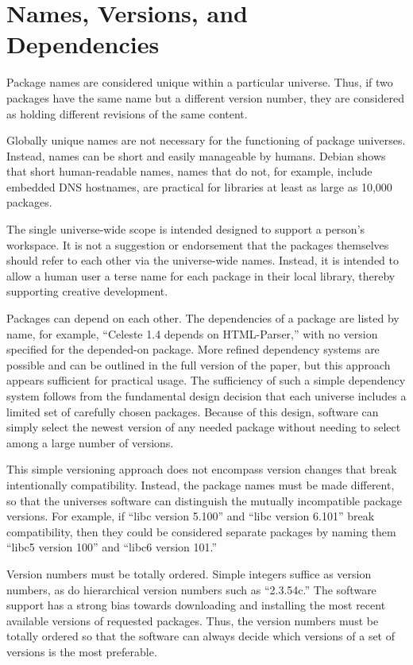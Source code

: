 \documentclass{IEEEtran}
\begin{document}
\section{Names, Versions, and Dependencies}

Package names are considered unique within a particular universe.
Thus, if two packages have the same name but a different version
number, they are considered as holding different revisions of the same
content.

Globally unique names are not necessary for the functioning of package
universes.  Instead, names can be short and easily manageable by
humans.  Debian shows that short human-readable names, names that do
not, for example, include embedded DNS hostnames, are practical for
libraries at least as large as 10,000 packages.

The single universe-wide scope is intended designed to support a
person's workspace. It is not a suggestion or endorsement that the
packages themselves should refer to each other via the universe-wide
names.  Instead, it is intended to allow a human user a terse name for
each package in their local library, thereby supporting creative
development.


Packages can depend on each other.  The dependencies of a package are
listed by name, for example, ``Celeste 1.4 depends on HTML-Parser,''
with no version specified for the depended-on package.  More refined
dependency systems are possible and can be outlined in the full
version of the paper, but this approach appears sufficient for
practical usage.  The sufficiency of such a simple dependency system
follows from the fundamental design decision that each universe
includes a limited set of carefully chosen packages.  Because of this
design, software can simply select the newest version of any needed
package without needing to select among a large number of versions.

This simple versioning approach does not encompass version changes
that break intentionally compatibility.  Instead, the package names
must be made different, so that the universes software can distinguish
the mutually incompatible package versions.  For example, if ``libc
version 5.100'' and ``libc version 6.101'' break compatibility, then
they could be considered separate packages by naming them ``libc5
version 100'' and ``libc6 version 101.''


Version numbers must be totally ordered.  Simple integers suffice as
version numbers, as do hierarchical version numbers such as
``2.3.54c.''  The software support has a strong bias towards
downloading and installing the most recent available versions of
requested packages.  Thus, the version numbers must be totally ordered
so that the software can always decide which versions of a set of
versions is the most preferable.
\end{document}
